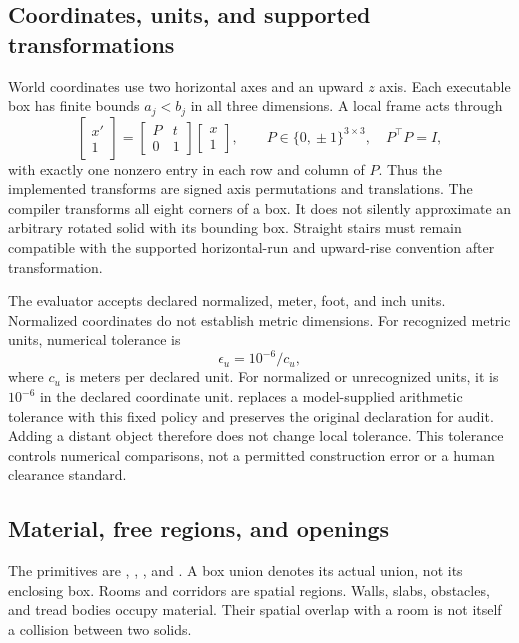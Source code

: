 \subsection{Coordinates, units, and supported transformations}
World coordinates use two horizontal axes and an upward $z$ axis. Each executable box has finite bounds $a_j<b_j$ in all three dimensions. A local frame acts through
\begin{equation}
\begin{bmatrix}x'\\1\end{bmatrix}
=\begin{bmatrix}P&t\\0&1\end{bmatrix}
\begin{bmatrix}x\\1\end{bmatrix},
\qquad P\in\{0,\!\pm1\}^{3\times3},\quad P^\top P=I,
\end{equation}
with exactly one nonzero entry in each row and column of $P$. Thus the implemented transforms are signed axis permutations and translations. The compiler transforms all eight corners of a box. It does not silently approximate an arbitrary rotated solid with its bounding box. Straight stairs must remain compatible with the supported horizontal-run and upward-rise convention after transformation.

The evaluator accepts declared normalized, meter, foot, and inch units. Normalized coordinates do not establish metric dimensions. For recognized metric units, numerical tolerance is
\begin{equation}
\epsilon_u=10^{-6}/c_u,
\end{equation}
where $c_u$ is meters per declared unit. For normalized or unrecognized units, it is $10^{-6}$ in the declared coordinate unit.  replaces a model-supplied arithmetic tolerance with this fixed policy and preserves the original declaration for audit. Adding a distant object therefore does not change local tolerance. This tolerance controls numerical comparisons, not a permitted construction error or a human clearance standard.

\subsection{Material, free regions, and openings}
The primitives are , , , and . A box union denotes its actual union, not its enclosing box. Rooms and corridors are spatial regions. Walls, slabs, obstacles, and tread bodies occupy material. Their spatial overlap with a room is not itself a collision between two solids.

